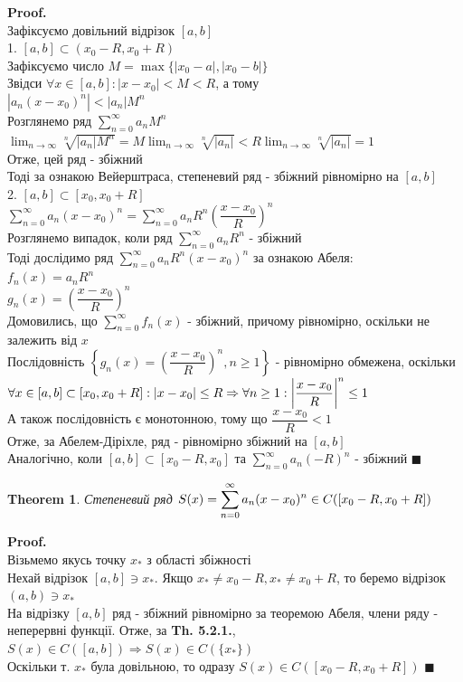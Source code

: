 \documentclass[a4paper, 14pt]{extarticle}
\def\huge{\displaystyle}
\def\bigline{\vspace{5mm}\\}
\theoremstyle{theoremdd}
\newtheorem{theorem}{Theorem}[subsection]
\theoremstyle{theoremdd}
\theoremstyle{theoremdd}
\theoremstyle{theoremdd}
\theoremstyle{theoremdd}
\theoremstyle{theoremdd}
\theoremstyle{theoremdd}
\theoremstyle{theoremdd}
\newenvironment{pf}{\vspace*{-3mm} \textbf{Proof. \\}}{$\blacksquare$}
\begin{document}
\begin{pf}
Зафіксуємо довільний відрізок $[a,b]$\\
1. $[a,b] \subset (x_0-R,x_0+R)$\\
Зафіксуємо число $M = \max\{|x_0-a|,|x_0-b|\}$\\
Звідси $\forall x \in [a,b]: |x-x_0| < M < R$, а тому\\
$|a_n(x-x_0)^n| < |a_n| M^n$\\
Розглянемо ряд $\huge \sum_{n=0}^\infty a_n M^n$\\
$\huge \lim_{n \to \infty} \sqrt[n]{|a_n| M^n} = M \lim_{n \to \infty} \sqrt[n]{|a_n|} < R \lim_{n \to \infty} \sqrt[n]{|a_n|} = 1$\\
Отже, цей ряд - збіжний\\
Тоді за ознакою Вейерштраса, степеневий ряд - збіжний рівномірно на $[a,b]$
\bigline
2. $[a,b] \subset [x_0,x_0+R]$\\
$\huge \sum_{n=0}^\infty a_n(x-x_0)^n = \sum_{n=0}^\infty a_n R^n \left( \dfrac{x-x_0}{R} \right)^n$\\
Розглянемо випадок, коли ряд $\huge \sum_{n=0}^\infty a_n R^n$ - збіжний\\
Тоді дослідимо ряд $\huge \sum_{n=0}^\infty a_n R^n (x-x_0)^n$ за ознакою Абеля:\\
$f_n(x) = a_n R^n$\\
$g_n(x) = \left( \dfrac{x-x_0}{R} \right)^n$\\
Домовились, що $\huge \sum_{n=0}^\infty f_n(x)$ - збіжний, причому рівномірно, оскільки не залежить від $x$\\
Послідовність $\left\{ g_n(x) = \left( \dfrac{x-x_0}{R} \right)^n, n \geq 1 \right\}$ - рівномірно обмежена, оскільки\\
$\forall x \in [a,b] \subset [x_0, x_0+R]: |x - x_0| \leq R \Rightarrow \forall n \geq 1: \abs{\dfrac{x-x_0}{R}}^n \leq 1$\\
А також послідовність є монотонною, тому що $\dfrac{x-x_0}{R} < 1$\\
Отже, за Абелем-Діріхле, ряд - рівномірно збіжний на $[a,b]$
\bigline
Аналогічно, коли $[a,b] \subset [x_0-R, x_0]$ та $\huge \sum_{n=0}^\infty a_n (-R)^n$ - збіжний
\end{pf}

\begin{theorem}
Степеневий ряд $\huge S(x) = \sum_{n=0}^\infty a_n(x-x_0)^n \\ \in C([x_0-R,x_0+R])$
\end{theorem}

\begin{pf}
Візьмемо якусь точку $x_*$ з області збіжності\\
Нехай відрізок $[a,b] \ni x_*$. Якщо $x_* \neq x_0 - R, x_* \neq x_0 + R$, то беремо відрізок $(a,b) \ni x_*$\\
На відрізку $[a,b]$ ряд - збіжний рівномірно за теоремою Абеля, члени ряду - неперервні функції. Отже, за \textbf{Th. 5.2.1.}, $S(x) \in C([a,b]) \Rightarrow S(x) \in C(\{x_*\})$\\
Оскільки т. $x_*$ була довільною, то одразу $S(x) \in C([x_0-R, x_0+R])$
\end{pf}
\end{document}
